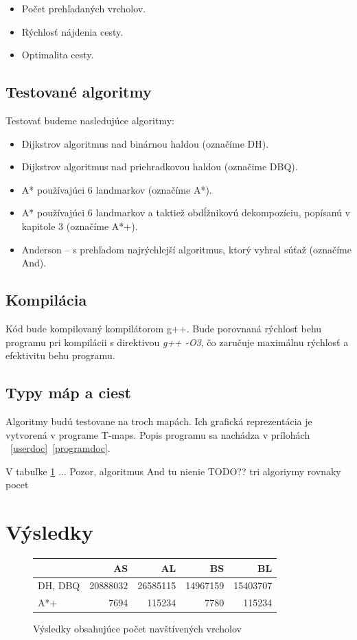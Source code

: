 \begin{itemize}
\item Počet prehľadaných vrcholov.
\item Rýchlosť nájdenia cesty.
\item Optimalita cesty. 
\end{itemize}


\subsection{Testované algoritmy}
Testovať budeme nasledujúce algoritmy:
\begin{itemize}
\item Dijkstrov algoritmus nad binárnou haldou (označíme DH).
\item Dijkstrov algoritmus nad priehradkovou haldou (označime DBQ).
\item A* používajúci 6 landmarkov (označíme A*).
\item A* používajúci 6 landmarkov a taktiež obdĺžnikovú dekompozíciu, popísanú v kapitole 3 (označíme A*+).
\item Anderson -- s prehľadom najrýchlejší algoritmus, ktorý vyhral súťaž (označíme And).
\end{itemize}


\subsection{Kompilácia}
Kód bude kompilovaný kompilátorom g++. Bude porovnaná
rýchlosť behu programu pri kompilácii s direktivou \emph{g++ -O3}, čo zaručuje maximálnu rýchlosť a efektivitu behu programu.

\subsection{Typy máp a ciest}
Algoritmy budú testovane na troch mapách. 
Ich grafická reprezentácia je vytvorená v programe T-maps.
Popis programu sa nachádza v prílohách ~\ref{userdoc}~\ref{programdoc}.


V tabuľke \ref{fig:verticesscanned_result} ... Pozor, algoritmus And tu nienie TODO?? tri algoriymy rovnaky pocet

\section{Výsledky}
\begin{figure}[H]
	\centering
	\begin{tabular}{|l | r|r|r|r|}
	\hline
	 & AS & AL & BS & BL \\
	\hline
	DH, DBQ & 20888032 & 26585115 & 14967159 & 15403707 \\
	A*+ & 7694 & 115234& 7780 & 115234 \\
	\hline
	\end{tabular}
	\caption{Výsledky obsahujúce počet navštívených vrcholov}
	\label{fig:verticesscanned_result}
\end{figure}

